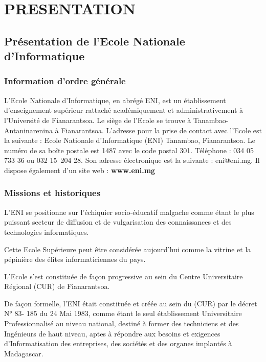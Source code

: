 \documentclass[12pt]{report}
\begin{document}
			\part{PRESENTATION}
			\chapter{Présentation de l’Ecole Nationale d’Informatique}
			\section{Information d’ordre générale }
				\hspace{15pt} L’Ecole Nationale d’Informatique, en abrégé ENI, est un établissement d’enseignement supérieur rattaché académiquement et administrativement à l’Université de Fianarantsoa. Le siège de l’Ecole se trouve à Tanambao-Antaninarenina à Fianarantsoa. L’adresse pour la prise de contact avec l’Ecole est la suivante : Ecole Nationale d’Informatique (ENI) Tanambao, Fianarantsoa. Le numéro de sa boîte postale est 1487 avec le code postal 301. Téléphone : 034 05 733 36 ou 032 15 204 28. Son adresse électronique est la suivante : eni@eni.mg. Il dispose également d'un site web : \textbf{www.eni.mg}
			\section{Missions et historiques}
				\hspace{15pt} L’ENI se positionne sur l’échiquier socio-éducatif malgache comme étant le plus puissant secteur de diffusion et de vulgarisation des connaissances et des technologies informatiques. 

				Cette Ecole Supérieure peut être considérée aujourd’hui comme la vitrine et la pépinière des élites informaticiennes du pays.
	
				L’Ecole s’est constituée de façon progressive au sein du Centre Universitaire Régional (CUR) de Fianarantsoa.

				De façon formelle, l’ENI était constituée et créée au sein du (CUR) par le décret N° 83- 185 du 24 Mai 1983, comme étant le seul établissement Universitaire Professionnalisé au niveau national, destiné à former des techniciens et des Ingénieurs de haut niveau, aptes à répondre aux besoins et exigences d’Informatisation des entreprises, des sociétés et des organes implantés à Madagascar.
\end{document}
